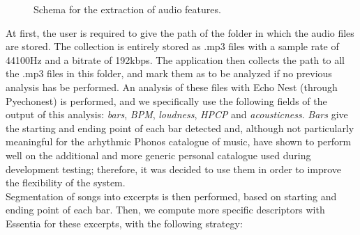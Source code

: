\begin{figure}[h]\hskip -1cm
\caption{Schema for the extraction of audio features.}
\label{fig:extraction}
\end{figure}
At first, the user is required to give the path of the folder in which the audio files are stored. The collection is entirely stored as .mp3 files with a sample rate of 44100Hz and a bitrate of 192kbps. The application then collects the path to all the .mp3 files in this folder, and mark them as to be analyzed if no previous analysis has be performed. An analysis of these files with Echo Nest (through Pyechonest) is performed, and we specifically use the following fields of the output of this analysis: \textit{bars}, \textit{BPM}, \textit{loudness}, \textit{HPCP} and \textit{acousticness}. \textit{Bars} give the starting and ending point of each bar detected and, although not particularly meaningful for the arhythmic Phonos catalogue of music, have shown to perform well on the additional and more generic personal catalogue used during development testing; therefore, it was decided to use them in order to improve the flexibility of the system. \\ Segmentation of songs into excerpts is then performed, based on starting and ending point of each bar. Then, we compute more specific descriptors with Essentia for these excerpts, with the following strategy:
